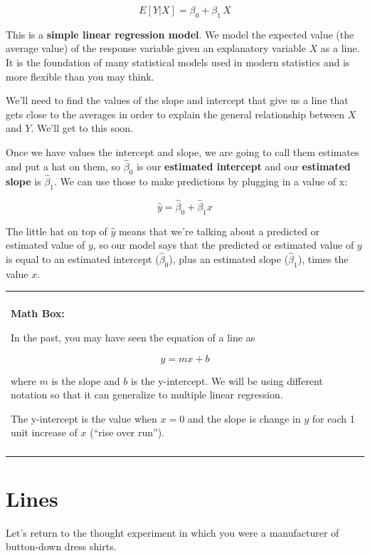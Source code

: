 \documentclass[
]{book}
\newenvironment{mathbox}
{
    \begin{center}
    
    \begin{tabular}{|p{0.8\textwidth}|}
    \rowcolor{LightYellow}
    \hline\\
    \rowcolor{LightYellow}
    \textbf{Math Box:}
}
{
    \\\rowcolor{LightYellow}
    \\\hline
    \end{tabular} 
    \end{center}
}
\begin{document}
\[E[Y | X] = \beta_0 + \beta_1\,X\]

This is a \textbf{simple linear regression model}. We model the expected value (the average value) of the response variable given an explanatory variable \(X\) as a line. It is the foundation of many statistical models used in modern statistics and is more flexible than you may think.

We'll need to find the values of the slope and intercept that give us a line that gets close to the averages in order to explain the general relationship between \(X\) and \(Y\). We'll get to this soon.

Once we have values the intercept and slope, we are going to call them estimates and put a hat on them, so \(\hat{\beta}_0\) is our \textbf{estimated intercept} and our \textbf{estimated slope} is \(\hat{\beta}_1\). We can use those to make predictions by plugging in a value of x:

\[\hat{y} = \hat{\beta}_0 +\hat{\beta}_1 x\]

The little hat on top of \(\hat{y}\) means that we're talking about a predicted or estimated value of \(y\), so our model says that the predicted or estimated value of \(y\) is equal to an estimated intercept (\(\hat{\beta}_0\)), plus an estimated slope (\(\hat{\beta}_1\)), times the value \(x\).

\begin{mathbox}
In the past, you may have seen the equation of a line as

\[y = mx + b\]

where \(m\) is the slope and \(b\) is the y-intercept. We will be using
different notation so that it can generalize to multiple linear
regression.

The y-intercept is the value when \(x=0\) and the slope is change in
\(y\) for each 1 unit increase of \(x\) (``rise over run'').
\end{mathbox}

\hypertarget{lines}{%
\section{Lines}\label{lines}}

Let's return to the thought experiment in which you were a manufacturer of button-down dress shirts.
\end{document}
